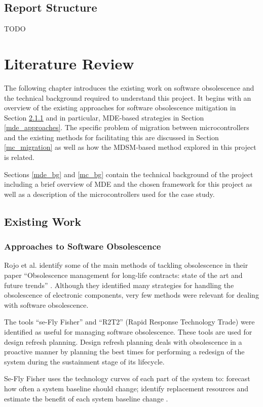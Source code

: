 \documentclass{UoYCSproject}
\begin{document}
\section{Report Structure}
TODO

\chapter{Literature Review}
The following chapter introduces the existing work on software obsolescence and the technical background required to understand this project. It begins with an overview of the existing approaches for software obsolescence mitigation in Section \ref{so_approaches} and in particular, MDE-based strategies in Section \ref{mde_approaches}. The specific problem of migration between microcontrollers and the existing methods for facilitating this are discussed in Section \ref{mc_migration} as well as how the MDSM-based method explored in this project is related. 

Sections \ref{mde_bg} and \ref{mc_bg} contain the technical background of the project including a brief overview of MDE and the chosen framework for this project as well as a description of the microcontrollers used for the case study.

\section{Existing Work}
\subsection{Approaches to Software Obsolescence} \label{so_approaches}
Rojo et al. identify some of the main methods of tackling obsolescence in their paper ``Obsolescence management for long-life contracts: state of the art and future trends'' \parencite{rojo2010obsolescence}. Although they identified many strategies for handling the obsolescence of electronic components, very few methods were relevant for dealing with software obsolescence.

The tools ``se-Fly Fisher'' and ``R2T2'' (Rapid Response Technology Trade) were identified as useful for managing software obsolescence. These tools are used for design refresh planning. Design refresh planning deals with obsolescence in a proactive manner by planning the best times for performing a redesign of the system during the sustainment stage of its lifecycle. 

Se-Fly Fisher uses the technology curves of each part of the system to: forecast how often a system baseline should change; identify replacement resources and estimate the benefit of each system baseline change \parencite{rojo2010obsolescence}.
\end{document}
